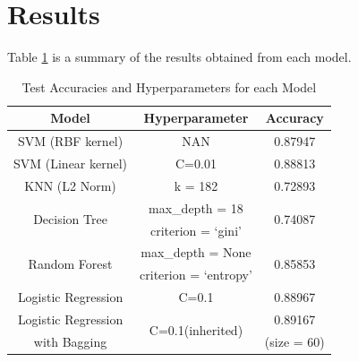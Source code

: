 \documentclass[10pt,twocolumn,letterpage]{article}
\begin{document}
	\section{Results}
	Table \ref{results} is a summary of the results obtained from each model. 
	\begin{table}[H]
		\begin{tabular}{|c|c|c|}
			\hline
			Model & Hyperparameter & Accuracy\\
			\hline 
			\hline
			SVM (RBF kernel) & NAN & 0.87947\\
			\hline
			SVM (Linear kernel) & C=0.01 & 0.88813\\
			\hline
			KNN (L2 Norm) & k = 182 & 0.72893\\
			\hline
			\multirow{2}{*}{Decision Tree}  & \small{max\_depth = 18} & \multirow{2}{*}{0.74087}\\
			                                 & \small{criterion = ‘gini’} & \\
			\hline
			\multirow{2}{*}{Random Forest} & \small{max\_depth = None} & \multirow{2}{*}{0.85853}\\
			 & \small{criterion = ‘entropy’}& \\
			\hline
			Logistic Regression & C=0.1 & 0.88967\\
			\hline
			Logistic Regression & \multirow{2}{*}{C=0.1(inherited)} & 0.89167 \\
			with Bagging & & (size = 60)\\
			\hline		
		\end{tabular}
		\caption{Test Accuracies and Hyperparameters for each Model}\label{results}
	\end{table}
\end{document}
